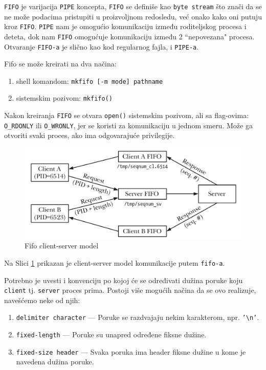 \documentclass[a4paper, 11pt, twoside]{article}
\begin{document}
\texttt{FIFO} je varijacija \texttt{PIPE} koncepta, \texttt{FIFO} se definiše kao \texttt{byte stream} što znači da se ne može podacima pristupiti u proizvoljnom redosledu, već onako kako oni putuju kroz \texttt{FIFO}. \texttt{PIPE} nam je omogućio komunikaciju između roditeljskog procesa i deteta, dok nam \texttt{FIFO} omogućuje komunikaciju između 2 ``nepovezana" procesa. Otvaranje \texttt{FIFO-a} je slično kao kod regularnog fajla, i \texttt{PIPE-a}. 

Fifo se može kreirati na dva načina:
\vspace{-2mm} 
\begin{enumerate}[1)]
	\item{shell komandom: \texttt{mkfifo [-m mode] pathname}}
	\item{sistemskim pozivom: \texttt{mkfifo()}}
\end{enumerate}

Nakon kreiranja \texttt{FIFO} se otvara \texttt{open()} sistemskim pozivom, ali sa flag-ovima: \texttt{O\_RDONLY} ili \texttt{O\_WRONLY}, jer se koristi za komunikaciju u jednom smeru. Može ga otvoriti svaki proces, ako ima odgovarajuće privilegije.

\vspace{1mm} 
\begin{figure}[h]
	\centering
	\includegraphics[width=.7\textwidth]{fifo-client-server.png} %
	\caption{Fifo client-server model}
	\label{fig:fifocs}
\end{figure}

\vspace{2mm} 
Na Slici \ref{fig:fifocs} prikazan je client-server model komunikacije putem \texttt{fifo-a}.

Potrebno je uvesti i konvenciju po kojoj će se određivati dužina poruke koju \texttt{client} tj. \texttt{server} proces prima. Postoji više mogućih načina da se ovo realizuje, navešćemo neke od njih:

\begin{enumerate}[1)]
	\item{\texttt{delimiter character} --- Poruke se razdvajaju nekim karakterom, npr. \texttt{'\textbackslash n'}.}
	\item{\texttt{fixed-length} --- Poruke su unapred određene fiksne dužine.}
	\item{\texttt{fixed-size header} --- Svaka poruka ima header fiksne dužine u kome je navedena dužina poruke.}
\end{enumerate}
\end{document}

